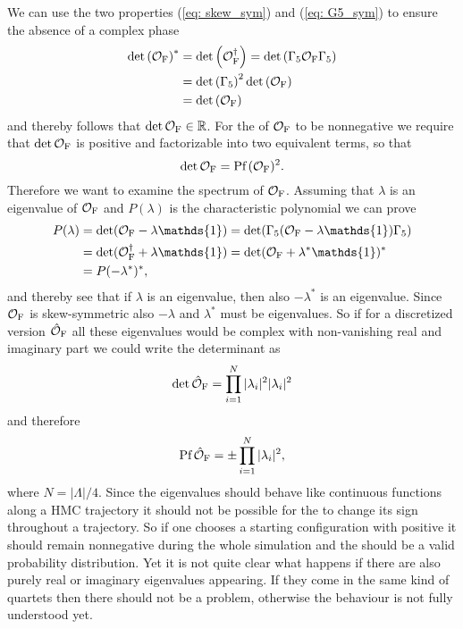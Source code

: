 %
%
We can use the two properties (\ref{eq: skew_sym}) and (\ref{eq: G5_sym}) to ensure the absence of a complex phase
%
%
\begin{align}
\det \left(\mathcal{O}_{\rm F}\right)^{*} &= \det  \left( \mathcal{O}_{\rm F}^{\dagger}\right) = \det \left( \Gamma_{5}\mathcal{O}_{\rm F} \Gamma_{5} \right) \notag \\
%
%
&= \det \left(\Gamma_{5}\right)^{2} \det \left(\mathcal{O}_{\rm F}\right) \\
%
%
&= \det \left(\mathcal{O}_{\rm F}\right) \notag
\end{align}
%
%
and thereby follows that $\det\mathcal{O}_{\rm F} \in \mathbb{R}$. For the  of $\mathcal{O}_{\rm F}$ to be nonnegative we require that $\det \mathcal{O}_{\rm F}$ is positive and factorizable into two equivalent terms, so that
%
%
\begin{equation}
\det \mathcal{O}_{\rm F} = \text{Pf}\,(\mathcal{O}_{\rm F})^{2}.
\end{equation}
%
%
Therefore we want to examine the spectrum of $\mathcal{O}_{\rm F}$. Assuming that $\lambda$ is an eigenvalue of $\mathcal{O}_{\rm F}$ and $P(\lambda)$ is the characteristic polynomial we can prove
%
%
\begin{align}
P(\lambda) &= \det (\mathcal{O}_{\rm F} -\lambda\mathds{1}) = \det (\Gamma_{5}(\mathcal{O}_{\rm F} -\lambda\mathds{1})\Gamma_{5}) \notag \\
%
&= \det (\mathcal{O}_{\rm F}^{\dagger}+\lambda\mathds{1}) = \det (\mathcal{O}_{\rm F} +\lambda^{*}\mathds{1})^{*} \\
&= P(-\lambda^{*})^{*}, \notag
\end{align}
%
%
and thereby see that if $\lambda$ is an eigenvalue, then also $-\lambda^{*}$ is an eigenvalue. Since $\mathcal{O}_{\rm F}$ is skew-symmetric also $-\lambda$ and $\lambda^{*}$ must be eigenvalues. So if for a discretized version $\hat{\mathcal{O}}_{\rm F}$ all these eigenvalues would be complex with non-vanishing real and imaginary part we could write the determinant as
%
%
\begin{equation}
\det \hat{\mathcal{O}}_{\rm F} = \prod\limits_{i=1}^{N} \vert \lambda_{i}\vert^{2} \vert \lambda_{i} \vert^{2}
\end{equation}
%
%
and therefore
%
%
\begin{equation}
\text{Pf}\,\hat{\mathcal{O}}_{\rm F} =  \pm\prod\limits_{i=1}^{N} \vert \lambda_{i}\vert^{2},
\end{equation}
%
%
where $N=\vert \mathit{\Lambda}\vert /4$. Since the eigenvalues should behave like continuous functions along a HMC trajectory it should not be possible for the  to change its sign throughout a trajectory. So if one chooses a starting configuration with positive  it should remain nonnegative during the whole simulation and the  should be a valid probability distribution. Yet it is not quite clear what happens if there are also purely real or imaginary eigenvalues appearing. If they come in the same kind of quartets then there should not be a problem, otherwise the behaviour is not fully understood yet.
%
%
%
%
%
%
%
%
%
%
